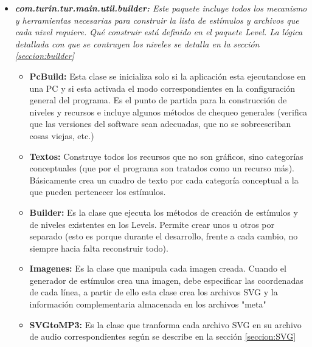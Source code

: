 \documentclass{article}
\numberwithin{figure}{section}
\begin{document}
\begin{itemize}
        \item \textit{\textbf{com.turin.tur.main.util.builder:} Este paquete incluye todos los mecanismo y herramientas necesarias para construir la lista de estímulos y archivos que cada nivel requiere. Qué construir está definido en el paquete Level. La lógica detallada con que se contruyen los niveles se detalla en la sección \ref{seccion:builder}}
        \begin{itemize}
            \item \textbf{PcBuild:} Esta clase se inicializa solo si la aplicación esta ejecutandose en una PC y si esta activada el modo correspondientes en la configuración general del programa. Es el punto de partida para la construcción de niveles y recursos e incluye algunos métodos de chequeo generales (verifica que las versiones del software sean adecuadas, que no se sobreescriban cosas viejas, etc.) 
            \item \textbf{Textos:} Construye todos los recursos que no son gráficos, sino categorías conceptuales (que por el programa son tratados como un recurso más). Básicamente crea un cuadro de texto por cada categoría conceptual a la que pueden pertenecer los estímulos. 
            \item \textbf{Builder:} Es la clase que ejecuta los métodos de creación de estímulos y de niveles existentes en los Levels. Permite crear unos u otros por separado (esto es porque durante el desarrollo, frente a cada cambio, no siempre hacia falta reconstruir todo).
            \item \textbf{Imagenes:} Es la clase que manipula cada imagen creada. Cuando el generador de estímulos crea una imagen, debe especificar las coordenadas de cada línea, a partir de ello esta clase crea los archivos SVG y la información complementaria almacenada en los archivos "meta"
            \item \textbf{SVGtoMP3:} Es la clase que tranforma cada archivo SVG en su archivo de audio correspondientes según se describe en la sección \ref{seccion:SVG}
        \end{itemize}
        

\end{itemize}
\end{document}
